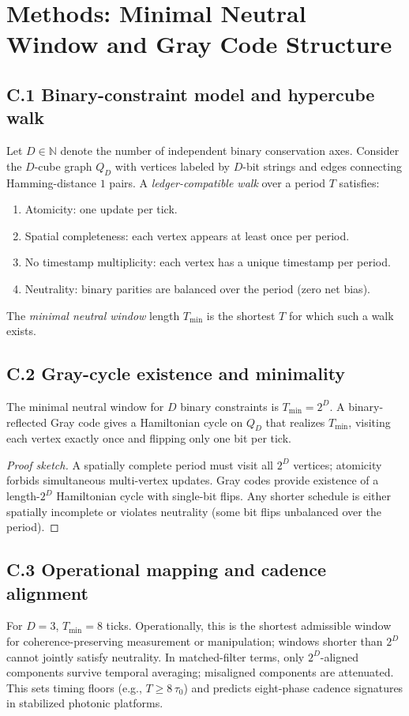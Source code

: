 \documentclass[12pt,a4paper]{article}
\begin{document}
\section{Methods: Minimal Neutral Window and Gray Code Structure}\label{app:minwindow}

\subsection*{C.1 Binary-constraint model and hypercube walk}
Let $D\in\mathbb{N}$ denote the number of independent binary conservation axes. Consider the $D$-cube graph $Q_{D}$ with vertices labeled by $D$-bit strings and edges connecting Hamming-distance $1$ pairs. A \emph{ledger-compatible walk} over a period $T$ satisfies:
\begin{enumerate}
  \item Atomicity: one update per tick.
  \item Spatial completeness: each vertex appears at least once per period.
  \item No timestamp multiplicity: each vertex has a unique timestamp per period.
  \item Neutrality: binary parities are balanced over the period (zero net bias).
\end{enumerate}
The \emph{minimal neutral window} length $T_{\min}$ is the shortest $T$ for which such a walk exists.

\subsection*{C.2 Gray-cycle existence and minimality}
\begin{theorem}
The minimal neutral window for $D$ binary constraints is $T_{\min}=2^{D}$. A binary-reflected Gray code gives a Hamiltonian cycle on $Q_{D}$ that realizes $T_{\min}$, visiting each vertex exactly once and flipping only one bit per tick.
\end{theorem}
\begin{proof}[Proof sketch]
A spatially complete period must visit all $2^{D}$ vertices; atomicity forbids simultaneous multi-vertex updates. Gray codes provide existence of a length-$2^{D}$ Hamiltonian cycle with single-bit flips. Any shorter schedule is either spatially incomplete or violates neutrality (some bit flips unbalanced over the period).
\end{proof}

\subsection*{C.3 Operational mapping and cadence alignment}
For $D=3$, $T_{\min}=8$ ticks. Operationally, this is the shortest admissible window for coherence-preserving measurement or manipulation; windows shorter than $2^{D}$ cannot jointly satisfy neutrality. In matched-filter terms, only $2^{D}$-aligned components survive temporal averaging; misaligned components are attenuated. This sets timing floors (e.g., $T\ge 8\,\tau_{0}$) and predicts eight-phase cadence signatures in stabilized photonic platforms.
\end{document}

